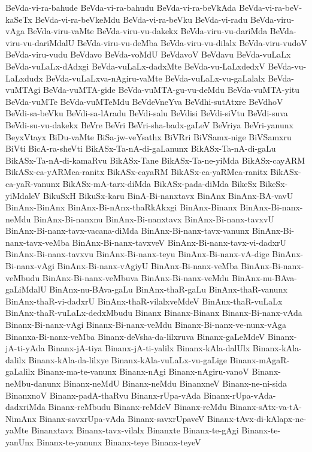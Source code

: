 {BeVda-vi-ra-bahude
BeVda-vi-ra-bahudu
BeVda-vi-ra-beVkAda
BeVda-vi-ra-beV-kaSeTx
BeVda-vi-ra-beVkeMdu
BeVda-vi-ra-beVku
BeVda-vi-radu
BeVda-viru-vAga
BeVda-viru-vaMte
BeVda-viru-vu-dakekx
BeVda-viru-vu-dariMda
BeVda-viru-vu-dariMdalU
BeVda-viru-vu-deMba
BeVda-viru-vu-dilalx
BeVda-viru-vudoV
BeVda-viru-vudu
BeVdavo
BeVda-voMdU
BeVdavoV
BeVdavu
BeVda-vuLaLx
BeVda-vuLaLx-dAdxgi
BeVda-vuLaLx-dadxMte
BeVda-vu-LaLxdedxV
BeVda-vu-LaLxdudx
BeVda-vuLaLxva-nAgiru-vaMte
BeVda-vuLaLx-vu-gaLalalx
BeVda-vuMTAgi
BeVda-vuMTA-gide
BeVda-vuMTA-gu-vu-deMdu
BeVda-vuMTA-yitu
BeVda-vuMTe
BeVda-vuMTeMdu
BeVdeVneYva
BeVdhi-sutAtxre
BeVdhoV
BeVdi-sa-beVku
BeVdi-sa-lAradu
BeVdi-salu
BeVdisi
BeVdi-siVtu
BeVdi-suva
BeVdi-su-vu-dakekx
BeVre
BeVri
BeVri-sha-badx-gaLeV
BeVriya
BeVri-yanunx
BeyxVtayx
BiDu-vaMte
BiSa-jw-veYsathx
BiVRri
BiVSamx-nige
BiVSamxru
BiVti
BicA-ra-sheVti
BikASx-Ta-nA-di-gaLanunx
BikASx-Ta-nA-di-gaLu
BikASx-Ta-nA-di-kamaRvu
BikASx-Tane
BikASx-Ta-ne-yiMda
BikASx-cayARM
BikASx-ca-yARMca-ranitx
BikASx-cayaRM
BikASx-ca-yaRMca-ranitx
BikASx-ca-yaR-vanunx
BikASx-mA-tarx-diMda
BikASx-pada-diMda
BikeSx
BikeSx-yiMdaleV
BikuSxH
BikuSx-karu
BinA-Bi-nanxtavx
BinAnx
BinAnx-BA-vavU
BinAnx-BinAnx
BinAnx-Bi-nAnx-thaRkAkxgi
BinAnx-Binanx
BinAnx-Bi-nanx-neMdu
BinAnx-Bi-nanxnu
BinAnx-Bi-nanxtavx
BinAnx-Bi-nanx-tavxvU
BinAnx-Bi-nanx-tavx-vacana-diMda
BinAnx-Bi-nanx-tavx-vanunx
BinAnx-Bi-nanx-tavx-veMba
BinAnx-Bi-nanx-tavxveV
BinAnx-Bi-nanx-tavx-vi-dadxrU
BinAnx-Bi-nanx-tavxvu
BinAnx-Bi-nanx-teyu
BinAnx-Bi-nanx-vA-dige
BinAnx-Bi-nanx-vAgi
BinAnx-Bi-nanx-vAgiyU
BinAnx-Bi-nanx-veMba
BinAnx-Bi-nanx-veMbudu
BinAnx-Bi-nanx-veMbuva
BinAnx-Bi-nanx-veMdu
BinAnx-nu-BAva-gaLiMdalU
BinAnx-nu-BAva-gaLu
BinAnx-thaR-gaLu
BinAnx-thaR-vanunx
BinAnx-thaR-vi-dadxrU
BinAnx-thaR-vilalxveMdeV
BinAnx-thaR-vuLaLx
BinAnx-thaR-vuLaLx-dedxMbudu
Binanx
Binanx-Binanx
Binanx-Bi-nanx-vAda
Binanx-Bi-nanx-vAgi
Binanx-Bi-nanx-veMdu
Binanx-Bi-nanx-ve-nunx-vAga
Binanxa-Bi-nanx-veMba
Binanx-deVsha-da-lilxruva
Binanx-gaLeMdeV
Binanx-jA-ti-yAda
Binanx-jA-tiya
Binanx-jA-ti-yalilx
Binanx-kAla-dalUlx
Binanx-kAla-dalilx
Binanx-kAla-da-lilxye
Binanx-kAla-vuLaLx-vu-gaLige
Binanx-mAgaR-gaLalilx
Binanx-ma-te-vanunx
Binanx-nAgi
Binanx-nAgiru-vanoV
Binanx-neMbu-danunx
Binanx-neMdU
Binanx-neMdu
BinanxneV
Binanx-ne-ni-sida
BinanxnoV
Binanx-padA-thaRvu
Binanx-rUpa-vAda
Binanx-rUpa-vAda-dadxriMda
Binanx-reMbudu
Binanx-reMdeV
Binanx-reMdu
Binanx-sAtx-va-tA-NimAnx
Binanx-savxrUpa-vAda
Binanx-savxrUpaveV
Binanx-tAvx-di-kAlapx-ne-yaMte
Binanxtavx
Binanx-tavx-vilalx
Binanxte
Binanx-te-gAgi
Binanx-te-yanUnx
Binanx-te-yanunx
Binanx-teye
Binanx-teyeV
}
